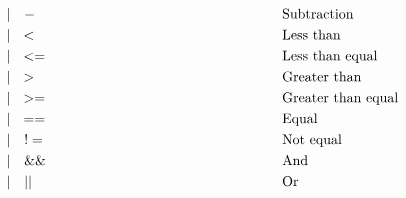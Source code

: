 \begin{fleqn}
\begin{align*}
                 &                                  &    & | \ \ \ -                             &  & \hspace*{5.6cm}\text{Subtraction}                      \\
                 &                                  &    & | \ \ <                               &  & \hspace*{5.6cm}\text{Less than}                        \\
                 &                                  &    & | \ \ <=                              &  & \hspace*{5.6cm}\text{Less than equal}                  \\
                 &                                  &    & | \ \ >                               &  & \hspace*{5.6cm}\text{Greater than}                     \\
                 &                                  &    & | \ \ >=                              &  & \hspace*{5.6cm}\text{Greater than equal}               \\
                 &                                  &    & | \ \ ==                              &  & \hspace*{5.6cm}\text{Equal}                            \\
                 &                                  &    & | \ \ \ !=                            &  & \hspace*{5.6cm}\text{Not equal}                        \\
                 &                                  &    & | \ \ \ \&\&                          &  & \hspace*{5.6cm}\text{And}                              \\
                 &                                  &    & | \ \ \ | |                           &  & \hspace*{5.6cm}\text{Or}                               \\
        \end{align*}

\end{fleqn}
